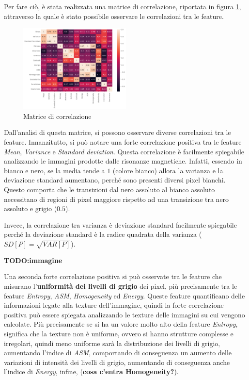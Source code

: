 Per fare ciò, è stata realizzata una matrice di correlazione, riportata in figura
\ref{fig:corr-matrix}, attraverso la quale è stato possibile osservare le correlazioni
tra le feature.

\begin{figure}[!ht]
      \centering
      \includegraphics[width=0.5\textwidth]{img/analisi/corr.png}
      \caption{Matrice di correlazione}
      \label{fig:corr-matrix}
\end{figure}

Dall'analisi di questa matrice, si possono osservare diverse correlazioni tra le
feature. Innanzitutto, si può notare una forte correlazione positiva tra le feature
\textit{Mean}, \textit{Variance} e \textit{Standard deviation}. Questa correlazione
è facilmente spiegabile analizzando le immagini prodotte dalle risonanze magnetiche.
Infatti, essendo in bianco e nero, se la media tende a $1$ (colore bianco) allora
la varianza e la deviazione standard aumentano, perché sono presenti diversi
pixel bianchi. Questo comporta che le transizioni dal nero assoluto al bianco
assoluto necessitano di regioni di pixel maggiore rispetto ad una transizione
tra nero assoluto e grigio ($0.5$).

Invece, la correlazione tra varianza è deviazione standard facilmente spiegabile
perché la deviazione standard è la radice quadrata della varianza ($SD[P] = \sqrt{VAR[P]}$).

\textbf{TODO:immagine}

Una seconda forte correlazione positiva si può osservate tra le feature che
misurano l'\textbf{uniformità dei livelli di grigio} dei pixel, più precisamente
tra le feature \textit{Entropy}, \textit{ASM}, \textit{Homogeneity} ed
\textit{Energy}. Queste feature quantificano delle informazioni legate alla
texture dell'immagine, quindi la forte correlazione positiva può essere spiegata
analizzando le texture delle immagini su cui vengono calcolate. Più precisamente
se si ha un valore molto alto della feature \textit{Entropy}, significa che la
texture non è uniforme, ovvero si hanno strutture complesse e irregolari, quindi
meno uniforme sarà la distribuzione dei livelli di grigio, aumentando l'indice
di \textit{ASM}, comportando di conseguenza un aumento delle variazioni di intensità
dei livelli di grigio, aumentando di conseguenza anche l'indice di \textit{Energy},
infine, (\textbf{cosa c'entra Homogeneity?}).

